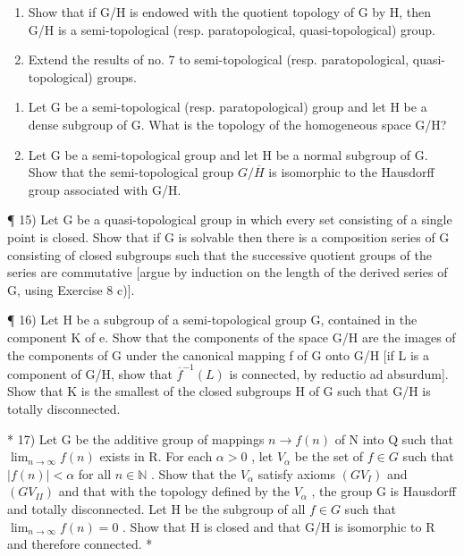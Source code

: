 \begin{enumerate}
\def\labelenumi{\alph{enumi})}
\item
  Show that if G/H is endowed with the quotient topology of G by H, then G/H is a semi-topological (resp. paratopological, quasi-topological) group.
\item
  Extend the results of no. 7 to semi-topological (resp. paratopological, quasi-topological) groups.
\end{enumerate}

\begin{enumerate}
\def\labelenumi{\arabic{enumi})}
\setcounter{enumi}{12}
\item
  Let G be a semi-topological (resp. paratopological) group and let H be a dense subgroup of G. What is the topology of the homogeneous space G/H?
\item
  Let G be a semi-topological group and let H be a normal subgroup of G. Show that the semi-topological group \(G/\overline{H}\) is isomorphic to the Hausdorff group associated with G/H.
\end{enumerate}

¶ 15) Let G be a quasi-topological group in which every set consisting of a single point is closed. Show that if G is solvable then there is a composition series of G consisting of closed subgroups such that the successive quotient groups of the series are commutative {[}argue by induction on the length of the derived series of G, using Exercise 8 c){]}.

¶ 16) Let H be a subgroup of a semi-topological group G, contained in the component K of e. Show that the components of the space G/H are the images of the components of G under the canonical mapping f of G onto G/H {[}if L is a component of G/H, show that \(\overline{f}^{-1}(L)\) is connected, by reductio ad absurdum{]}. Show that K is the smallest of the closed subgroups H of G such that G/H is totally disconnected.

* 17) Let G be the additive group of mappings \(n \to f(n)\) of N into Q such that \(\lim_{n \to \infty} f(n)\) exists in R. For each \(\alpha > 0\) , let \(V_{\alpha}\) be the set of \(f \in G\) such that \(|f(n)| < \alpha\) for all \(n \in \mathbb{N}\) . Show that the \(V_{\alpha}\) satisfy axioms \((GV_{I})\) and \((GV_{II})\) and that with the topology defined by the \(V_{\alpha}\) , the group G is Hausdorff and totally disconnected. Let H be the subgroup of all \(f \in G\) such that \(\lim_{n \to \infty} f(n) = 0\) . Show that H is closed and that G/H is isomorphic to R and therefore connected. *

